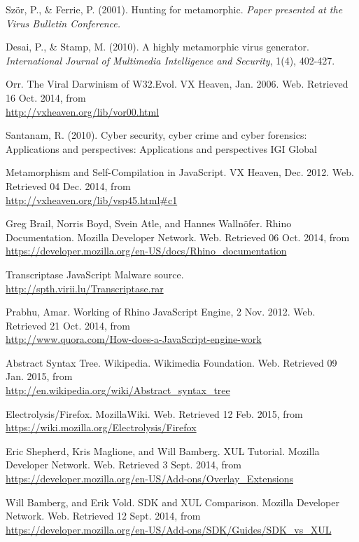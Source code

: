 \begin{thebibliography}{10}
 Ször, P., \& Ferrie, P. (2001). Hunting for metamorphic. {\it Paper presented at the Virus Bulletin Conference.}

 Desai, P., \& Stamp, M. (2010). A highly metamorphic virus generator. {\it International Journal of Multimedia Intelligence and Security}, 1(4), 402-427.

 Orr. The Viral Darwinism of W32.Evol. VX Heaven, Jan. 2006. Web. Retrieved 16 Oct. 2014, from \\
\url{http://vxheaven.org/lib/vor00.html}

 Santanam, R. (2010). Cyber security, cyber crime and cyber forensics: Applications and perspectives: Applications and perspectives IGI Global

 Metamorphism and Self-Compilation in JavaScript. VX Heaven, Dec. 2012. Web. Retrieved 04 Dec. 2014, from \\
\url{http://vxheaven.org/lib/vsp45.html#c1}

 Greg Brail, Norris Boyd, Svein Atle, and Hannes Wallnöfer. Rhino Documentation. Mozilla Developer Network. Web. Retrieved 06 Oct. 2014, from \\
\url{https://developer.mozilla.org/en-US/docs/Rhino_documentation}

 Transcriptase JavaScript Malware source. \\
\url{http://spth.virii.lu/Transcriptase.rar}

 Prabhu, Amar. Working of Rhino JavaScript Engine, 2 Nov. 2012. Web. Retrieved 21 Oct. 2014, from \\ 
\url{http://www.quora.com/How-does-a-JavaScript-engine-work}

 Abstract Syntax Tree. Wikipedia. Wikimedia Foundation. Web. Retrieved 09 Jan. 2015, from \\
\url{http://en.wikipedia.org/wiki/Abstract_syntax_tree}

 Electrolysis/Firefox. MozillaWiki. Web. Retrieved 12 Feb. 2015, from \\
\url{https://wiki.mozilla.org/Electrolysis/Firefox}

 Eric Shepherd, Kris Maglione, and Will Bamberg. XUL Tutorial. Mozilla Developer Network. Web. Retrieved 3 Sept. 2014, from \\
\url{https://developer.mozilla.org/en-US/Add-ons/Overlay_Extensions}

 Will Bamberg, and Erik Vold. SDK and XUL Comparison. Mozilla Developer Network. Web. Retrieved 12 Sept. 2014, from \\
\url{https://developer.mozilla.org/en-US/Add-ons/SDK/Guides/SDK_vs_XUL}

\end{thebibliography}
